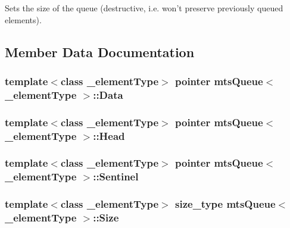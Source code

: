 Sets the size of the queue (destructive, i.\-e. won't preserve previously queued elements). 

\subsection{Member Data Documentation}
\hypertarget{classmts_queue_a7967ce45474f4266531201ec0ff65480}{
\subsubsection[{Data}]{\setlength{\rightskip}{0pt plus 5cm}template$<$class \-\_\-element\-Type$>$ {\bf pointer} {\bf mts\-Queue}$<$ \-\_\-element\-Type $>$\-::Data\hspace{0.3cm}{\ttfamily [protected]}}}\label{classmts_queue_a7967ce45474f4266531201ec0ff65480}
\hypertarget{classmts_queue_a9d7bee24b9b1e45e318dee474d66f12c}{
\subsubsection[{Head}]{\setlength{\rightskip}{0pt plus 5cm}template$<$class \-\_\-element\-Type$>$ {\bf pointer} {\bf mts\-Queue}$<$ \-\_\-element\-Type $>$\-::Head\hspace{0.3cm}{\ttfamily [protected]}}}\label{classmts_queue_a9d7bee24b9b1e45e318dee474d66f12c}
\hypertarget{classmts_queue_aa80fac3217d8148da5383e6fe9ac0fa4}{
\subsubsection[{Sentinel}]{\setlength{\rightskip}{0pt plus 5cm}template$<$class \-\_\-element\-Type$>$ {\bf pointer} {\bf mts\-Queue}$<$ \-\_\-element\-Type $>$\-::Sentinel\hspace{0.3cm}{\ttfamily [protected]}}}\label{classmts_queue_aa80fac3217d8148da5383e6fe9ac0fa4}
\hypertarget{classmts_queue_ac479b4223b71cdc7f9b49325e91ab6c6}{
\subsubsection[{Size}]{\setlength{\rightskip}{0pt plus 5cm}template$<$class \-\_\-element\-Type$>$ {\bf size\-\_\-type} {\bf mts\-Queue}$<$ \-\_\-element\-Type $>$\-::Size\hspace{0.3cm}{\ttfamily [protected]}}}\label{classmts_queue_ac479b4223b71cdc7f9b49325e91ab6c6}
